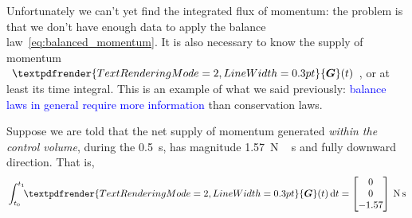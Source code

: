 \documentclass[a4paper,12pt,%
onecolumn,oneside,titlepage,%
british%
]{memoir}
\renewcommand*{\bm}[1]{\textpdfrender{TextRenderingMode=2,LineWidth=0.3pt}{\boldsymbol{#1}}}
\newcommand*{\di}{\mathrm{d}}%
\renewcommand*{\|}[1][]{\nonscript\:#1\vert\nonscript\:\mathopen{}}
\newcommand*{\sect}{\S}%
\renewcommand*{\autoref}[2]{\sidepar{\vspace{-1ex}\footnotesize{\color{blue}\faIcon{%
reply%
}\enspace\sect\,\ref{#1} page\,\pageref{#1}}}\textcolor{blue}{#2}}
\newcommand*{\yG}{\bm{G}}
\newcommand*{\yti}{t_{0}}
\newcommand*{\ytf}{t_{1}}
\begin{document}
Unfortunately we can't yet find the integrated flux of momentum: the problem is that we don't have enough data to apply the balance law~\eqref{eq:balanced_momentum}. It is also necessary to know the supply of momentum $\yG(t)$, or at least its time integral. This is an example of what we said previously: \autoref{sec:balance_laws}{balance laws in general require more information} than conservation laws. %

Suppose we are told that the net supply of momentum generated \emph{within the control volume}, during the \qty{0.5}{s}, has magnitude \qty{1.57}{N\,s} and fully downward direction. That is,
\begin{equation*}
  \int_{\yti}^{\ytf}\!\!\yG(t)\,\di t
  =
  \begin{bmatrix}
    0\\0\\\num{-1.57}
  \end{bmatrix}\:\unit{N\,s}
\end{equation*}
\end{document}
